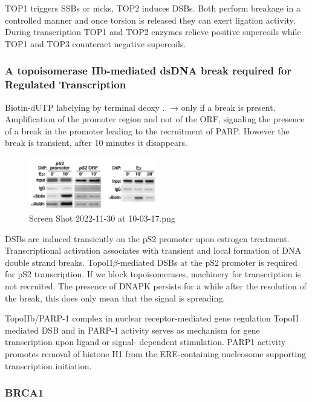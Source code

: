 TOP1 triggers SSBs or nicks, TOP2 induces DSBs. Both perform breakage in a controlled manner and once torsion is released they can exert ligation activity. During transcription TOP1 and TOP2 enzymes relieve positive supercoils while TOP1 and TOP3 counteract negative supercoils.

\hypertarget{a-topoisomerase-iib-mediated-dsdna-break-required-for-regulated-transcription}{%
\subsubsection{A topoisomerase IIb-mediated dsDNA break required for Regulated Transcription}\label{a-topoisomerase-iib-mediated-dsdna-break-required-for-regulated-transcription}}

Biotin-dUTP labelying by terminal deoxy .. → only if a break is present. Amplification of the promoter region and not of the ORF, signaling the presence of a break in the promoter leading to the recruitment of PARP. However the break is transient, after 10 minutes it disappears.

\begin{figure}
\centering
\includegraphics[width=0.5\textwidth]{../_resources/Screen_Shot_2022-11-30_at_10-03-17.png}
\caption{Screen Shot 2022-11-30 at 10-03-17.png}
\end{figure}

DSBs are induced transiently on the pS2 promoter upon estrogen treatment. Transcriptional activation associates with transient and local formation of DNA double strand breaks. TopoII$\beta$-mediated DSBs at the pS2 promoter is required for pS2 transcription. If we block topoisomerases, machinery for transcription is not recruited. The presence of DNAPK persists for a while after the resolution of the break, this does only mean that the signal is spreading.

TopoIIb/PARP-1 complex in nuclear receptor-mediated gene regulation TopoII mediated DSB and in PARP-1 activity serves as mechanism for gene transcription upon ligand or signal- dependent stimulation. PARP1 activity promotes removal of histone H1 from the ERE-containing nucleosome supporting transcription initiation.

\hypertarget{brca1}{%
\subsubsection{BRCA1}\label{brca1}}

